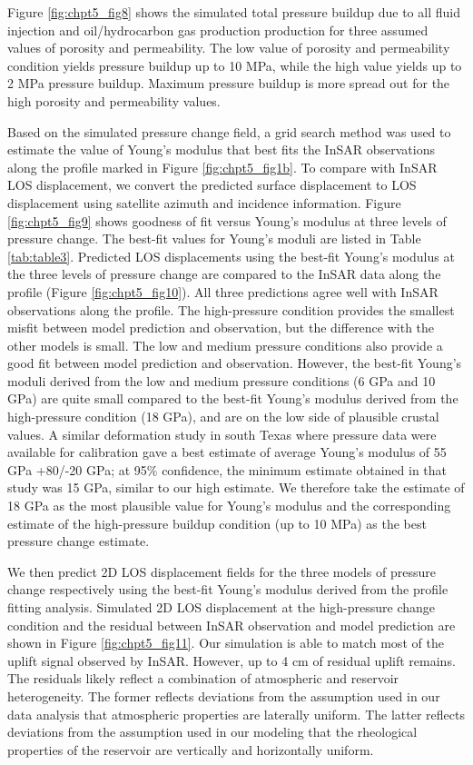 Figure \ref{fig:chpt5_fig8} shows the simulated total pressure buildup due to all fluid injection and oil/hydrocarbon gas production production for three assumed values of porosity and permeability. The low value of porosity and permeability condition yields pressure buildup up to 10 MPa, while the high value yields up to 2 MPa pressure buildup. Maximum pressure buildup is more spread out for the high porosity and permeability values.

Based on the simulated pressure change field, a grid search method was used to estimate the value of Young’s modulus that best fits the InSAR observations along the profile marked in Figure \ref{fig:chpt5_fig1b}.   To compare with InSAR LOS displacement, we convert the predicted surface displacement to LOS displacement using satellite azimuth and incidence information.  Figure \ref{fig:chpt5_fig9} shows goodness of fit versus Young’s modulus at three levels of pressure change.  The best-fit values for Young’s moduli are listed in Table \ref{tab:table3}.  Predicted LOS displacements using the best-fit Young’s modulus at the three levels of pressure change are compared to the InSAR data along the profile (Figure \ref{fig:chpt5_fig10}).  All three predictions agree well with InSAR observations along the profile.  The high-pressure condition provides the smallest misfit between model prediction and observation, but the difference with the other models is small.  The low and medium pressure conditions also provide a good fit between model prediction and observation.  However, the best-fit Young’s moduli derived from the low and medium pressure conditions (6 GPa  and 10 GPa) are quite small compared to the best-fit Young’s modulus derived from the high-pressure condition (18 GPa), and are on the low side of plausible crustal values.   A similar deformation study in south Texas \cite[]{karegar2015gps} where pressure data were available for calibration gave a best estimate of average Young’s modulus of 55 GPa +80/-20 GPa; at 95\% confidence, the minimum estimate obtained in that study was 15 GPa, similar to our high estimate.  We therefore take the estimate of 18 GPa as the most plausible value for Young’s modulus and the corresponding estimate of the high-pressure buildup condition (up to 10 MPa) as the best pressure change estimate.

We then predict 2D LOS displacement fields for the three models of pressure change respectively using the best-fit Young’s modulus derived from the profile fitting analysis.  Simulated 2D LOS displacement at the high-pressure change condition and the residual between InSAR observation and model prediction are shown in Figure \ref{fig:chpt5_fig11}.  Our simulation is able to match most of the uplift signal observed by InSAR.  However, up to 4 cm of residual uplift remains.  The residuals likely reflect a combination of atmospheric and reservoir heterogeneity.  The former reflects deviations from the assumption used in our data analysis that atmospheric properties are laterally uniform.  The latter reflects deviations from the assumption used in our modeling that the rheological properties of the reservoir are vertically and horizontally uniform. 

